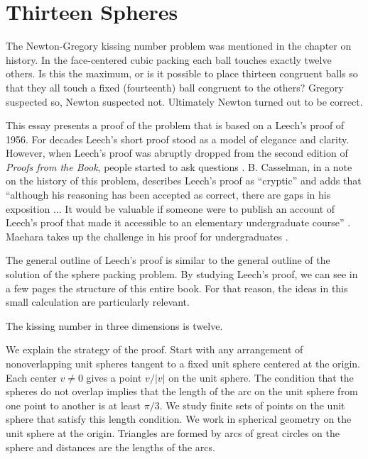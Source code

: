 \section{Thirteen Spheres}\label{sec:13s}

The Newton-Gregory kissing number problem  was mentioned in the chapter on
history.  In the face-centered cubic packing each ball touches exactly twelve
others.  Is this the maximum, 
or is it possible to place thirteen congruent balls so that they
all touch a fixed (fourteenth) ball congruent to the others?
Gregory suspected so, Newton suspected not.  Ultimately Newton turned
out to be correct. 


This essay presents a proof of the problem that is based on a Leech's proof
of 1956.  For decades Leech's short proof stood as a model of elegance and clarity.
However,  when Leech's proof was abruptly dropped from the second
edition of {\it Proofs from the Book}, people started to ask questions \cite{AZ98}.  
B. Casselman, in a note on
the history of this problem, describes Leech's proof as ``cryptic'' and adds 
that ``although his reasoning has been accepted as correct, there are gaps in his
exposition $\ldots$  It would be valuable if someone were to publish an account
of Leech's proof that made it accessible to an elementary undergraduate course'' \cite{BC04}.
Maehara takes up the challenge in his proof for undergraduates \cite{Mae07}.

The general outline of Leech's proof is similar to the general outline of the solution
of the sphere packing problem.  By studying Leech's proof, we can see in a few pages
the structure of this entire book.  For that reason, the ideas in this small calculation
are particularly relevant. 

\begin{theorem} The kissing number in three dimensions is twelve.
\end{theorem}

We explain the strategy of the proof.    
Start with any arrangement
of nonoverlapping 
unit spheres tangent to a fixed unit sphere centered at the origin.  Each
center $v\ne0$ gives a point $v/|v|$ on the unit sphere.  The condition
that the spheres do not overlap implies that the length of the arc on the
unit sphere from one point to another is at least $\pi/3$.  
We study finite sets of points on the unit sphere that satisfy this length condition.
We work in spherical geometry on the
unit sphere at the origin.
Triangles are formed by arcs of great circles on the sphere and distances are
the lengths of the arcs.

